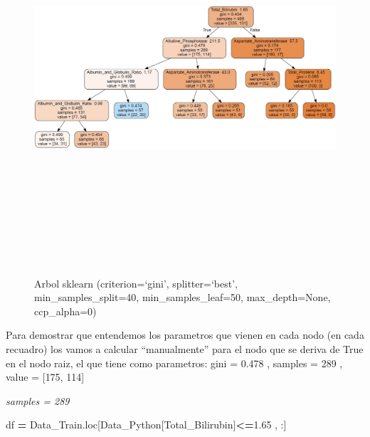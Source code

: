 \documentclass[
  11pt,
  a4paper,
]{article}
\newenvironment{Shaded}{\begin{snugshade}}{\end{snugshade}}
\newcommand{\FloatTok}[1]{\textcolor[rgb]{0.00,0.00,0.81}{#1}}
\newcommand{\NormalTok}[1]{#1}
\newcommand{\OperatorTok}[1]{\textcolor[rgb]{0.81,0.36,0.00}{\textbf{#1}}}
\newcommand{\StringTok}[1]{\textcolor[rgb]{0.31,0.60,0.02}{#1}}
\begin{document}
\begin{figure}
\centering
\includegraphics[width=6.45833in,height=5.72917in]{output_660_0.jpg}
\caption{Arbol sklearn (criterion=`gini', splitter=`best',
min\_samples\_split=40, min\_samples\_leaf=50, max\_depth=None,
ccp\_alpha=0)}
\end{figure}

\newpage

Para demostrar que entendemos los parametros que vienen en cada nodo (en
cada recuadro) los vamos a calcular ``manualmente'' para el nodo que se
deriva de True en el nodo raiz, el que tiene como parametros: gini =
0.478 , samples = 289 , value = {[}175, 114{]}

\vspace{0.2cm}

\emph{samples = 289}

\begin{Shaded}
\begin{Highlighting}[]
\NormalTok{df }\OperatorTok{=}\NormalTok{ Data\_Train.loc[Data\_Python[}\StringTok{\textquotesingle{}Total\_Bilirubin\textquotesingle{}}\NormalTok{]}\OperatorTok{\textless{}=}\FloatTok{1.65}\NormalTok{ , :]}
\end{Highlighting}
\end{Shaded}
\end{document}

